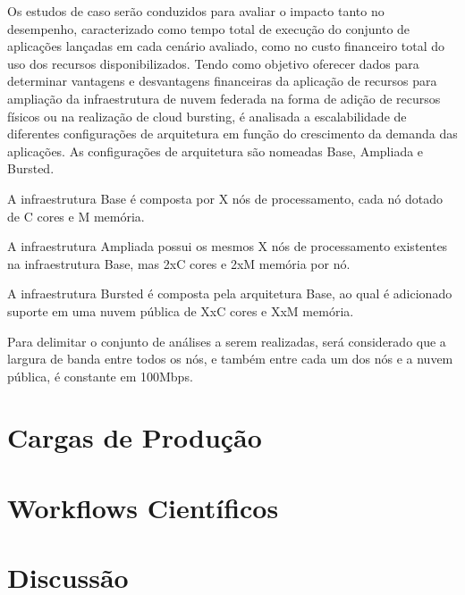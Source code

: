 \documentclass[tese,capa]{texufpel}
\begin{document}
Os estudos de caso serão conduzidos para avaliar o impacto tanto no desempenho, caracterizado como tempo total de execução do conjunto de aplicações lançadas em cada cenário avaliado, como no custo financeiro total do uso dos recursos disponibilizados. Tendo como objetivo oferecer dados para determinar vantagens e desvantagens financeiras da aplicação de recursos para ampliação da infraestrutura de nuvem federada na forma de adição de recursos físicos ou na realização de cloud bursting, é analisada a escalabilidade de diferentes configurações de arquitetura em função do crescimento da demanda das aplicações. As configurações de arquitetura são nomeadas Base, Ampliada e Bursted.

A infraestrutura Base é composta por X nós de processamento, cada nó dotado de C cores e M memória. 

A infraestrutura Ampliada possui os mesmos X nós de processamento existentes na infraestrutura Base, mas 2xC cores e 2xM memória por nó.

A infraestrutura Bursted é composta pela arquitetura Base, ao qual é adicionado suporte em uma nuvem pública de XxC cores e XxM memória.

Para delimitar o conjunto de análises a serem realizadas, será considerado que a largura de banda entre todos os nós, e também entre cada um dos nós e a nuvem pública, é constante em 100Mbps.

\section{Cargas de Produção}\label{sec:googleloads}

\section{Workflows Científicos}\label{sec:workflowloads}

\section{Discussão}\label{sec:discussaocasosdeestudo}
\end{document}
